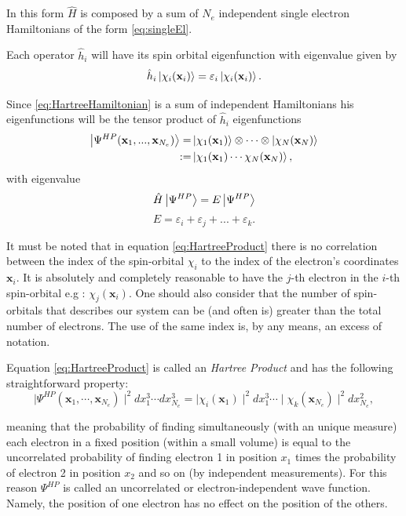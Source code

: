 \documentclass[a4paper,12pt]{article}
\begin{document}
In this form $\hat{H}$ is composed by a sum of $N_e$ independent single electron Hamiltonians of the form \eqref{eq:singleEl}.

Each operator $\hat{h}_i$ will have its spin orbital eigenfunction with eigenvalue given by
\begin{equation}
	\hat{h}_{i} \ket{\chi_{i}(\mathbf{x}_i) } = \varepsilon_{i} \ket{\chi_{i}(\mathbf{x}_i) }.
\end{equation}

Since \eqref{eq:HartreeHamiltonian} is a sum of independent Hamiltonians his eigenfunctions will be the tensor product of $\hat{h}_i$ eigenfunctions
\begin{align}\label{eq:HartreeProduct}
	\ket{\Psi^{HP}(\mathbf{x}_{1},...,\mathbf{x}_{N_e})} = & \ket{\chi_1(\mathbf{x}_{1})} \otimes \cdots  \otimes \ket{\chi_N(\mathbf{x}_{N})} \\
	:= & \ket{ \chi_{1}(\mathbf{x}_{1}) \cdots \chi_{N}(\mathbf{x}_{N}) },
\end{align}
with eigenvalue
\begin{equation}
	\hat{H}\ket{\Psi^{HP}} = E\ket{\Psi^{HP}}
\end{equation}
\begin{equation}
	E = \varepsilon_i + \varepsilon_j + ... + \varepsilon_k.
\end{equation}

It must be noted that in equation \eqref{eq:HartreeProduct} there is no correlation between the index of the spin-orbital $\chi_{i}$ to the index of the electron's coordinates $\mathbf{x}_i$. It is absolutely and completely reasonable to have the $j$-th electron in the $i$-th spin-orbital e.g : $\chi_{j}(\mathbf{x}_{i})$.
One should also consider that the number of spin-orbitals that describes our system can be (and often is) greater than the total number of electrons. The use of the same index is, by any means, an excess of notation.


Equation \eqref{eq:HartreeProduct} is called an \textit{Hartree Product} and has the following straightforward property: 
\begin{equation}\label{eq:uncorrelated}
	\mid\Psi^{HP}(\mathbf{x}_1,\cdots,\mathbf{x}_{N_e}) \mid^2 dx_1^3 \cdots dx_{N_e}^3 = \mid\chi_i(\mathbf{x}_1)\mid^2 dx_1^3 \cdots \mid \chi_k(\mathbf{x}_{N_e})\mid^2 dx_{N_e}^2,
\end{equation}

meaning that the probability of finding simultaneously (with an unique measure) each electron in a fixed position (within a small volume) is equal to the uncorrelated probability of finding electron 1 in position $x_1$ times the probability of electron 2 in position $x_2$ and so on (by independent measurements).
For this reason $\Psi^{HP}$ is called an uncorrelated or electron-independent wave function. 
Namely, the position of one electron has no effect on the position of the others. 
\end{document}
